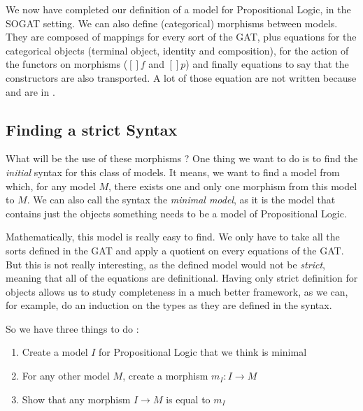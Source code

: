 \documentclass[10pt,a4paper]{article}
\begin{document}
			\begin{tcolorbox}
				\agdasep
				\agdasep
			\end{tcolorbox}
			
			We now have completed our definition of a model for Propositional Logic, in the SOGAT setting. We can also define (categorical) morphisms between models. They are composed of mappings for every sort of the GAT, plus equations for the categorical objects (terminal object, identity and composition), for the action of the functors on morphisms ($[]f$ and $[]p$) and finally equations to say that the constructors are also transported. A lot of those equation are not written because  and  are in \AgdaPrimitive{Prop}.
			\begin{tcolorbox}
				\agda{agda/ZOL-13.tex}
				\agdasep
				\agda{agda/ZOL-15.tex}
			\end{tcolorbox}
		
		\subsection{Finding a strict Syntax}
			
			What will be the use of these morphisms ? One thing we want to do is to find the \emph{initial} syntax for this class of models. It means, we want to find a model from which, for any model $M$, there exists one and only one morphism from this model to $M$. We can also call the syntax the \emph{minimal model}, as it is the model that contains just the objects something needs to be a model of Propositional Logic.
			
			Mathematically, this model is really easy to find. We only have to take all the sorts defined in the GAT and apply a quotient on every equations of the GAT. But this is not really interesting, as the defined model would not be \emph{strict}, meaning that all of the equations are definitional. Having only strict definition for objects allows us to study completeness in a much better framework, as we can, for example, do an induction on the types as they are defined in the syntax.
			
			So we have three things to do :
			\begin{enumerate}
				\setlength{\itemsep}{-1ex}
				\item Create a model $I$ for Propositional Logic that we think is minimal
				\item For any other model $M$, create a morphism $m_I : I \to M$
				\item Show that any morphism $I \to M$ is equal to $m_I$
			\end{enumerate}
		
\end{document}

